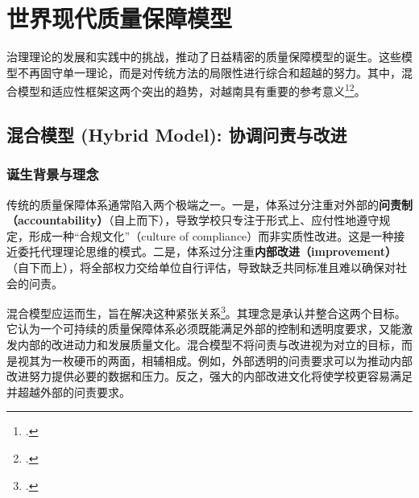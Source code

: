 \section{世界现代质量保障模型}
\label{sec:mo_hinh_hien_dai_the_gioi}

治理理论的发展和实践中的挑战，推动了日益精密的质量保障模型的诞生。这些模型不再固守单一理论，而是对传统方法的局限性进行综合和超越的努力。其中，混合模型和适应性框架这两个突出的趋势，对越南具有重要的参考意义\footcite{HybridModel2023}\footcite{AdaptiveQA2022}。

\subsection{混合模型 (Hybrid Model): 协调问责与改进}

\subsubsection{诞生背景与理念}
传统的质量保障体系通常陷入两个极端之一。一是，体系过分注重对外部的\textbf{问责制（accountability）}（自上而下），导致学校只专注于形式上、应付性地遵守规定，形成一种“合规文化”（culture of compliance）而非实质性改进。这是一种接近委托代理理论思维的模式。二是，体系过分注重\textbf{内部改进（improvement）}（自下而上），将全部权力交给单位自行评估，导致缺乏共同标准且难以确保对社会的问责。

混合模型应运而生，旨在解决这种紧张关系\footcite{EUA_Integration}。其理念是承认并整合这两个目标。它认为一个可持续的质量保障体系必须既能满足外部的控制和透明度要求，又能激发内部的改进动力和发展质量文化。混合模型不将问责与改进视为对立的目标，而是视其为一枚硬币的两面，相辅相成。例如，外部透明的问责要求可以为推动内部改进努力提供必要的数据和压力。反之，强大的内部改进文化将使学校更容易满足并超越外部的问责要求。


